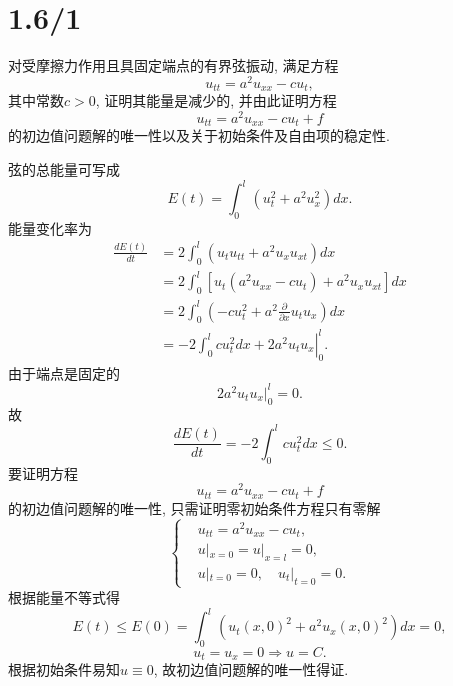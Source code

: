 \documentclass[11pt,a4paper]{article}
\begin{document}
\section{1.6/1}
\begin{problem}
对受摩擦力作用且具固定端点的有界弦振动, 满足方程
$$u_{tt}=a^2u_{xx}-cu_t,$$
其中常数$c>0$, 证明其能量是减少的, 并由此证明方程
$$u_{tt}=a^2u_{xx}-cu_t+f$$
的初边值问题解的唯一性以及关于初始条件及自由项的稳定性.
\end{problem}

弦的总能量可写成
$$E(t)=\int_0^l(u_t^2+a^2u_x^2)dx.$$
能量变化率为
\begin{align*}
  \frac{dE(t)}{dt}
   & =2\int_0^l\left(u_tu_{tt}+a^2u_{x}u_{xt}\right)dx                     \\
   & =2\int_0^l\left[u_t\left(a^2u_{xx}-cu_t\right)+a^2u_xu_{xt}\right]dx  \\
   & =2\int_0^l\left(-cu_t^2+a^2\frac{\partial}{\partial x}u_tu_x\right)dx \\
   & =\left.-2\int_0^lcu_t^2dx+2a^2u_tu_x\right|_0^l.
\end{align*}
由于端点是固定的
$$2a^2u_tu_x\bigg|_0^l=0.$$
故
$$\frac{dE(t)}{dt}=-2\int_0^lcu_t^2dx\leqslant 0.$$
要证明方程
$$u_{tt}=a^2u_{xx}-cu_t+f$$
的初边值问题解的唯一性, 只需证明零初始条件方程只有零解
$$\left\{\begin{aligned}
     & u_{tt}=a^2u_{xx}-cu_t,         \\
     & u|_{x=0}=u|_{x=l}=0,           \\
     & u|_{t=0}=0,\quad u_t|_{t=0}=0.
  \end{aligned}\right.$$
根据能量不等式得$$E(t)\leqslant E(0)=\int_0^l\left(u_t(x,0)^2+a^2u_x(x,0)^2\right)dx=0,$$
$$u_t=u_x=0\Longrightarrow u=C.$$
根据初始条件易知$u\equiv0$, 故初边值问题解的唯一性得证.
\end{document}
